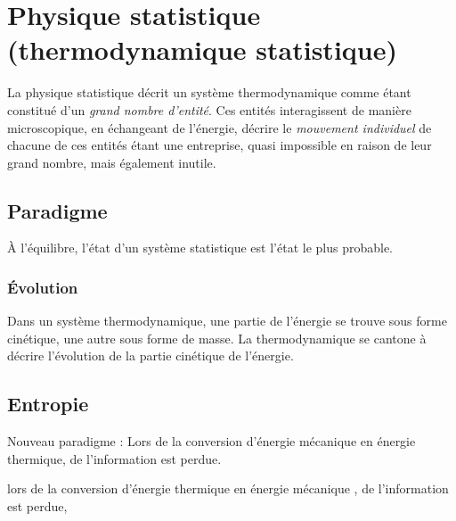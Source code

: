 

\section{Physique statistique (thermodynamique statistique)}

La physique statistique décrit un système thermodynamique comme étant constitué d'un {\it grand nombre d'entité}. Ces entités interagissent de manière microscopique, en échangeant de l'énergie, décrire le {\it mouvement individuel} de chacune de ces entités étant une entreprise, quasi impossible en raison de leur grand nombre, mais également inutile.

  \subsection{Paradigme}

À l'équilibre, l'état d'un système statistique est l'état le plus probable.

  \subsubsection{Évolution}

Dans un système thermodynamique, une partie de l'énergie se trouve sous forme cinétique, une autre sous forme de masse. La thermodynamique se cantone à décrire l'évolution de la partie cinétique de l'énergie.


 \subsection{Entropie}

Nouveau paradigme : Lors de la conversion d'énergie mécanique en énergie thermique, de l'information est perdue.



 lors de la conversion d'énergie thermique en énergie mécanique , de l'information est perdue, 






